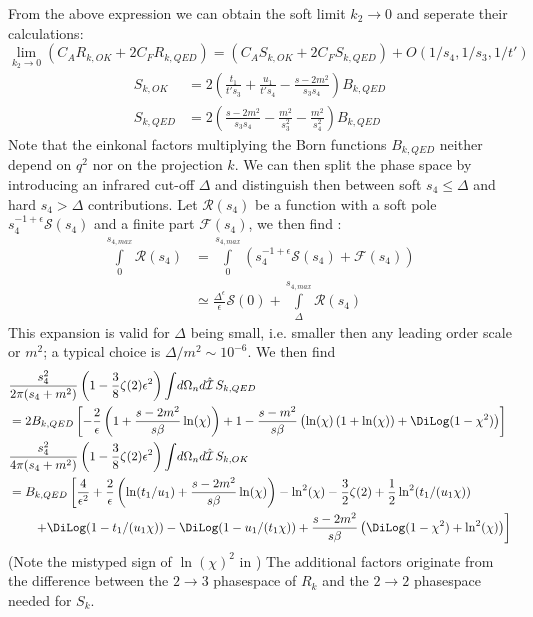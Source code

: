 From the above expression we can obtain the soft limit $k_2\rightarrow 0$ and seperate their calculations:
\begin{equation}
\lim_{k_2\rightarrow 0}\left(C_A R_{k,OK} + 2C_F R_{k,QED}\right) = \left(C_A S_{k,OK} + 2C_F S_{k,QED}\right) + O(1/s_4,1/s_3,1/t')
\end{equation}
\begin{align}
S_{k,OK}  &= 2\left(\frac{t_1}{t's_3} + \frac{u_1}{t's_4}-\frac{s-2m^2}{s_3s_4}\right)B_{k,QED}\\
S_{k,QED} &= 2\left(\frac{s-2m^2}{s_3s_4} - \frac{m^2}{s_3^2} - \frac{m^2}{s_4^2}\right)B_{k,QED}
\end{align}
Note that the einkonal factors multiplying the Born functions $B_{k,QED}$ neither depend on $q^2$ nor on the projection $k$. We can then split the phase space by introducing an infrared cut-off $\Delta$ and distinguish then between soft $s_4\leq \Delta$ and hard $s_4>\Delta$ contributions. Let $\mathcal R(s_4)$ be a function with a soft pole $s_4^{-1+\epsilon}\mathcal S(s_4)$ and a finite part $\mathcal F(s_4)$, we then find \cite{Bojak:2000eu}:
\begin{align}
\int\limits_0^{s_{4,max}} \!\!\mathcal R(s_4) &= \int\limits_0^{s_{4,max}} \!\!\left(s_4^{-1+\epsilon}\mathcal S(s_4) + \mathcal F(s_4)\right)\\
 &\simeq \frac{\Delta^\epsilon}{\epsilon}\mathcal S(0) + \int\limits_\Delta^{s_{4,max}}\!\!\mathcal R(s_4)
\end{align}
This expansion is valid for $\Delta$ being small, i.e. smaller then any leading order scale or $m^2$; a typical choice is $\Delta/m^2 \sim 10^{-6}$. We then find
\begin{align}
&\frac{s_4^2}{2\pi(s_4+m^2)}\left(1-\frac 3 8 \zeta(2)\epsilon^2\right)\int\!d\Omega_n d\hat{\mathcal I}\,S_{k,QED}\nonumber\\
 &= 2B_{k,QED}\left[-\frac 2 \epsilon\left(1+\frac{s-2m^2}{s\beta}\ln(\chi)\right)
+1 - \frac{s-m^2}{s\beta}\left(\ln(\chi)\left(1+\ln(\chi)\right) + \DiLog(1-\chi^2)\right)
\right] \\
&\frac{s_4^2}{4\pi(s_4+m^2)}\left(1-\frac 3 8 \zeta(2)\epsilon^2\right)\int\!d\Omega_n d\hat{\mathcal I}\,S_{k,OK} \nonumber\\
 &=B_{k,QED}\left[\frac 4 {\epsilon^2} + \frac 2 \epsilon\left(\ln(t_1/u_1)+\frac{s-2m^2}{s\beta}\ln(\chi)\right)-\ln^2(\chi) - \frac 3 2 \zeta(2)+\frac 1 2\ln^2(t_1/(u_1\chi))\right.\nonumber\\
 &\hspace{20pt}\left. +\DiLog(1-t_1/(u_1\chi)) - \DiLog(1-u_1/(t_1\chi)) + \frac{s-2m^2}{s\beta}\left(
\DiLog(1-\chi^2)+\ln^2(\chi)
\right) \right]
\end{align}
(Note the mistyped sign of $\ln(\chi)^2$ in \cite[eq. (3.25)]{Laenen1993162}) The additional factors originate from the difference between the $2\rightarrow 3$ phasespace of $R_{k}$ and the $2\rightarrow 2$ phasespace needed for $S_k$.

